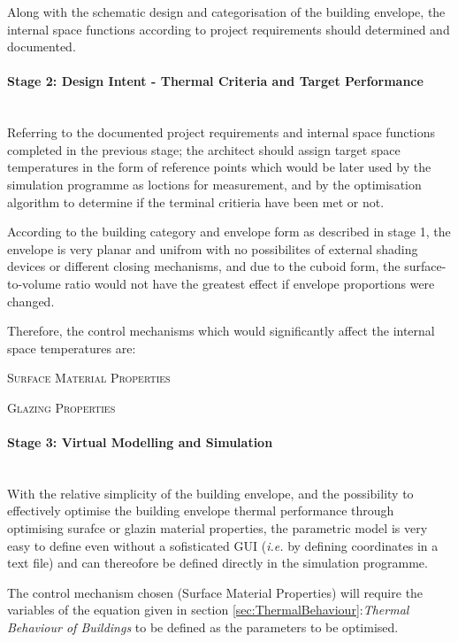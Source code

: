 Along with the schematic design and categorisation of the building envelope, the internal space functions according to project requirements should determined and documented.

\paragraph{Stage 2: Design Intent - Thermal Criteria and Target Performance}\mbox{}\\

Referring to the documented project requirements and internal space functions completed in the previous stage; the architect should assign target space temperatures in the form of reference points which would be later used by the simulation programme as loctions for measurement, and by the optimisation algorithm to determine if the terminal critieria have been met or not.

According to the building category and envelope form as described in stage 1, the envelope is very planar and unifrom with no possibilites of external shading devices or different closing mechanisms, and due to the cuboid form, the surface-to-volume ratio would not have the greatest effect if envelope proportions were changed.

Therefore, the control mechanisms which would significantly affect the internal space temperatures are:
\begin{compactenum}
	\item \textsc{Surface Material Properties}
	\item \textsc{Glazing Properties}
\end{compactenum}

\paragraph{Stage 3: Virtual Modelling and Simulation}\mbox{}\\

With the relative simplicity of the building envelope, and the possibility to effectively optimise the building envelope thermal performance through optimising surafce or glazin material properties, the parametric model is very easy to define even without a sofisticated GUI (\emph{i.e.} by defining coordinates in a text file) and can thereofore be defined directly in the simulation programme.

The control mechanism chosen (Surface Material Properties) will require the variables of the equation given in section \ref{sec:ThermalBehaviour}:\emph{Thermal Behaviour of Buildings} to be defined as the parameters to be optimised.

